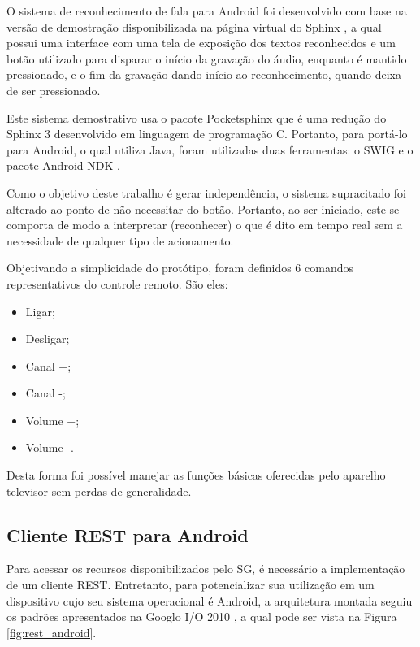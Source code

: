 \documentclass[12pt,a4paper,oneside]{report}
\begin{document}
O sistema de reconhecimento de fala para Android foi desenvolvido com base na versão de demostração disponibilizada na página virtual do Sphinx \cite{cmusphinx}, a qual possui uma interface com uma tela de exposição dos textos reconhecidos e um botão utilizado para disparar o início da gravação do áudio, enquanto é mantido pressionado, e o fim da gravação dando início ao reconhecimento, quando deixa de ser pressionado.

Este sistema demostrativo usa o pacote Pocketsphinx que é uma redução do Sphinx 3 desenvolvido em linguagem de programação C. Portanto, para portá-lo para Android, o qual utiliza Java, foram utilizadas duas ferramentas: o SWIG \cite{swig} e o pacote Android NDK \cite{ndk}.

Como o objetivo deste trabalho é gerar independência, o sistema supracitado foi alterado ao ponto de não necessitar do botão. Portanto, ao ser iniciado, este se comporta de modo a interpretar (reconhecer) o que é dito em tempo real sem a necessidade de qualquer tipo de acionamento.

Objetivando a simplicidade do protótipo, foram definidos 6 comandos representativos do controle remoto. São eles:
\begin{itemize}
    \item Ligar;
    \item Desligar;
    \item Canal +;
    \item Canal -;
    \item Volume +;
    \item Volume -.
\end{itemize}

Desta forma foi possível manejar as funções básicas oferecidas pelo aparelho televisor sem perdas de generalidade.

\subsection{Cliente REST para Android}

Para acessar os recursos disponibilizados pelo SG, é necessário a implementação de um cliente REST. Entretanto, para potencializar sua utilização em um dispositivo cujo seu sistema operacional é Android, a arquitetura montada seguiu os padrões apresentados na Googlo I/O 2010 \cite{restclient}, a qual pode ser vista na Figura \ref{fig:rest_android}.
\end{document}
